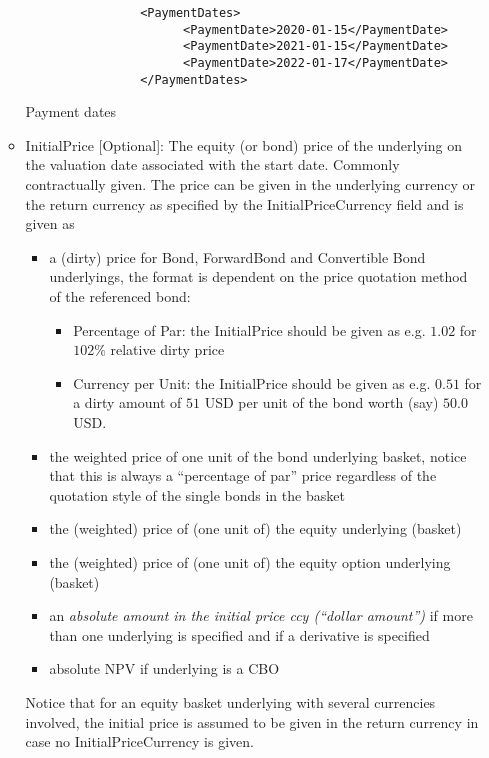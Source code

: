 \begin{itemize}
\begin{itemize}
    \begin{listing}[H]
\begin{verbatim}
                <PaymentDates>
                      <PaymentDate>2020-01-15</PaymentDate>
                      <PaymentDate>2021-01-15</PaymentDate>
                      <PaymentDate>2022-01-17</PaymentDate>
                </PaymentDates>
\end{verbatim}
\caption{Payment dates}
\label{lst:paymentdatestrs}
\end{listing}
    
  \item InitialPrice [Optional]: The equity (or bond) price of the underlying
    on the valuation date associated with the start date. Commonly contractually given. The price can be given in the
    underlying currency or the return currency as specified by the InitialPriceCurrency field and is given as
    \begin{itemize}
    \item a (dirty) price for Bond, ForwardBond and Convertible Bond underlyings, the format is dependent on the price quotation method of the referenced bond:
      \begin{itemize}
      \item Percentage of Par: the InitialPrice should be given as e.g. $1.02$ for $102\%$ relative dirty price
      \item Currency per Unit: the InitialPrice should be given as e.g. $0.51$ for a dirty amount of $51$ USD per unit
        of the bond worth (say) $50.0$ USD.
      \end{itemize}
      \item the weighted price of one unit of the bond underlying basket, notice that this is always a ``percentage of
        par'' price regardless of the quotation style of the single bonds in the basket
      \item the (weighted) price of (one unit of) the equity underlying (basket)
      \item the (weighted) price of (one unit of) the equity option underlying (basket)
      \item an {\em absolute amount in the initial price ccy (``dollar amount'')} if more than one underlying is
        specified and if a derivative is specified
      \item absolute NPV if underlying is a CBO
    \end{itemize}
    Notice that for an equity basket underlying with several currencies involved, the initial price is assumed to be given in the
    return currency in case no InitialPriceCurrency is given.


\end{itemize}
\end{itemize}
